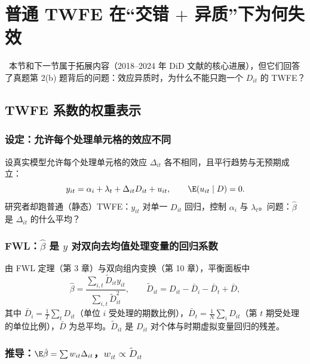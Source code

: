 \section{普通 TWFE 在“交错 \texorpdfstring{$+$}{+} 异质”下为何失效}\label{sec:U15b-fail}

\tagext\ 本节和下一节属于拓展内容（2018--2024 年 DiD 文献的核心进展），但它们回答了真题第 2(b) 题背后的问题：效应异质时，为什么不能只跑一个 $D_{it}$ 的 TWFE？

\subsection{TWFE 系数的权重表示}

\subsubsection{设定：允许每个处理单元格的效应不同}

设真实模型允许每个处理单元格的效应 $\Delta_{it}$ 各不相同，且平行趋势与无预期成立：
\[
y_{it}=\alpha_i+\lambda_t+\Delta_{it}D_{it}+u_{it},\qquad \E(u_{it}\mid D)=0 .
\]
研究者却跑普通（静态）TWFE：$y_{it}$ 对单一 $D_{it}$ 回归，控制 $\alpha_i$ 与 $\lambda_t$。问题：$\hat\beta$ 是 $\Delta_{it}$ 的什么平均？

\subsubsection{FWL：\texorpdfstring{$\hat\beta$}{beta hat} 是 \texorpdfstring{$y$}{y} 对双向去均值处理变量的回归系数}

由 FWL 定理（第 3 章）与双向组内变换（第 10 章），平衡面板中
\[
\hat\beta=\frac{\sum_{i,t}\tilde D_{it}y_{it}}{\sum_{i,t}\tilde D_{it}^2},\qquad
\tilde D_{it}=D_{it}-\bar D_{i}-\bar D_{t}+\bar D,
\]
其中 $\bar D_i=\frac1T\sum_tD_{it}$（单位 $i$ 受处理的期数比例），$\bar D_t=\frac1N\sum_iD_{it}$（第 $t$ 期受处理的单位比例），$\bar D$ 为总平均。$\tilde D_{it}$ 是 $D_{it}$ 对个体与时期虚拟变量回归的残差。

\subsubsection{推导：\texorpdfstring{$\E\hat\beta=\sum w_{it}\Delta_{it}$}{E beta hat = sum of w times Delta}，\texorpdfstring{$w_{it}\propto\tilde D_{it}$}{w proportional to Dtilde}}

